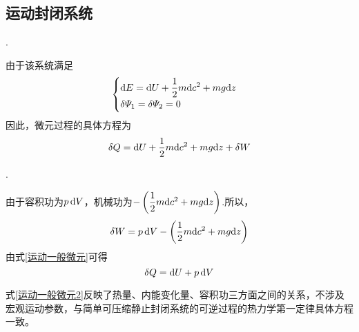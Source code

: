 \subsection{运动封闭系统}
. \dya[一般情况]\rgap
\par 由于该系统满足
\begin{equation}
	\begin{cases}
		\displaystyle {\rm{d}} E ={\rm{d}} U + \frac{1}{2} m {\rm{d}} c^2 + mg {\rm{d}} z\\
		\displaystyle \delta \varPsi_1 = \delta \varPsi_2=0
	\end{cases}
\end{equation}
因此，微元过程的具体方程为
\begin{equation}
	\delta Q = {\rm{d}} U + \frac 1 2 m {\rm{d}} c^2 +mg {\rm{d}} z + \delta W
	\label{运动一般微元}
\end{equation}
\vspace*{1em}

. \dya[简单可压缩运动封闭系统的可逆过程]\rgap
\par 由于容积功为$p \, {\rm{d}} V$，机械功为$- \left(\dfrac{1}{2} m {\rm{d}} c^2 + mg {\rm{d}} z\right)$.所以，
\begin{equation}
	\delta W = p \, {\rm{d}} V - \left(\dfrac{1}{2} m {\rm{d}} c^2 + mg {\rm{d}} z\right)
\end{equation}
由式\eqref{运动一般微元}可得
\begin{equation}
	\delta Q = {\rm{d}} U + p \, {\rm{d}} V
	\label{运动一般微元2}
\end{equation}
\begin{itemizea}
	\item 式\eqref{运动一般微元2}反映了热量、内能变化量、容积功三方面之间的关系，不涉及宏观运动参数，与简单可压缩静止封闭系统的可逆过程的热力学第一定律具体方程一致。
\end{itemizea}
\vspace*{1em}

